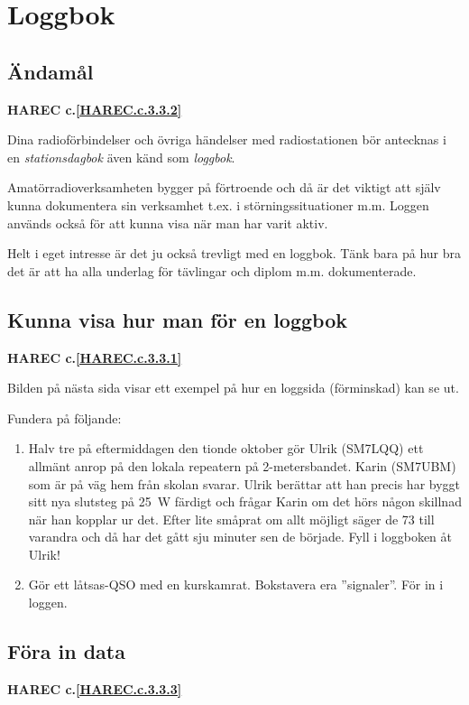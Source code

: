 \section{Loggbok}

\subsection{Ändamål}
\textbf{HAREC
  c.\ref{HAREC.c.3.3.2}\label{myHAREC.c.3.3.2}
}

Dina radioförbindelser och övriga händelser med radiostationen bör
antecknas i en \emph{stationsdagbok} även känd som \emph{loggbok}.

Amatörradioverksamheten bygger på förtroende och då är det viktigt att
själv kunna dokumentera sin verksamhet t.ex. i störningssituationer
m.m. Loggen används också för att kunna visa när man har varit aktiv.

Helt i eget intresse är det ju också trevligt med en loggbok. Tänk
bara på hur bra det är att ha alla underlag för tävlingar och diplom
m.m. dokumenterade.

\subsection{Kunna visa hur man för en loggbok}
\textbf{HAREC
  c.\ref{HAREC.c.3.3.1}\label{myHAREC.c.3.3.1}
}

Bilden på nästa sida visar ett exempel på hur en loggsida (förminskad)
kan se ut.

Fundera på följande:
\begin{enumerate}
\item Halv tre på eftermiddagen den tionde oktober gör Ulrik (SM7LQQ)
  ett allmänt anrop på den lokala repeatern på 2-metersbandet.  Karin
  (SM7UBM) som är på väg hem från skolan svarar. Ulrik berättar att
  han precis har byggt sitt nya slutsteg på 25~W färdigt och frågar
  Karin om det hörs någon skillnad när han kopplar ur det. Efter lite
  småprat om allt möjligt säger de 73 till varandra och då har det
  gått sju minuter sen de började.  Fyll i loggboken åt Ulrik!
\item Gör ett låtsas-QSO med en kurskamrat. Bokstavera era
  ''signaler''. För in i loggen.
\end{enumerate}

\subsection{Föra in data}
\textbf{HAREC
  c.\ref{HAREC.c.3.3.3}\label{myHAREC.c.3.3.3}
}

